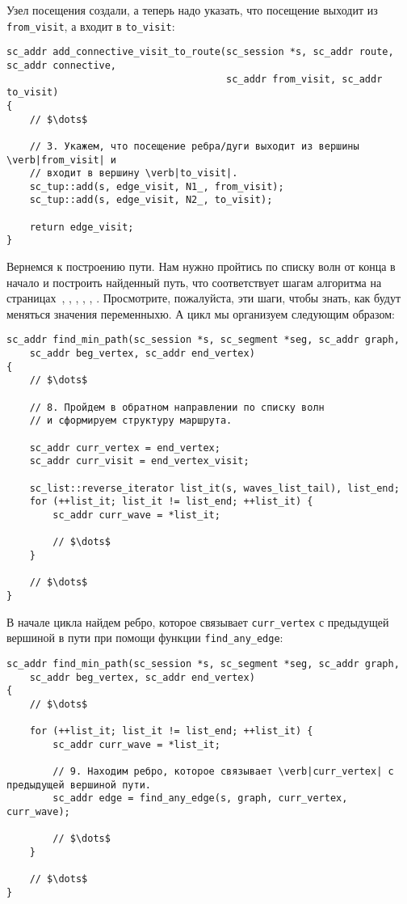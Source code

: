 Узел посещения создали, а теперь надо указать, что посещение выходит
из \lstinline|from_visit|, а входит в \lstinline|to_visit|:

\begin{lstlisting}[texcl]
sc_addr add_connective_visit_to_route(sc_session *s, sc_addr route, sc_addr connective,
                                      sc_addr from_visit, sc_addr to_visit)
{
    // $\dots$

    // 3. Укажем, что посещение ребра/дуги выходит из вершины \verb|from_visit| и
    // входит в вершину \verb|to_visit|.
    sc_tup::add(s, edge_visit, N1_, from_visit);
    sc_tup::add(s, edge_visit, N2_, to_visit);

    return edge_visit;
}
\end{lstlisting}

Вернемся к построению пути. Нам нужно пройтись по списку волн от конца
в начало и построить найденный путь, что соответствует шагам алгоритма
на страницах~\pageref{astep:S10_Step_building_route_structure},
\pageref{astep:S11_Step_building_route_structure_add_visits},
\pageref{astep:S12_Step_building_route_structure},
\pageref{astep:S13_Step_building_route_structure_add_visits},
\pageref{astep:S14_Step_building_route_structure},
\pageref{astep:S15_Step_building_route_structure_add_visits}. Просмотрите,
пожалуйста, эти шаги, чтобы знать, как будут меняться значения
переменныхю. А цикл мы организуем следующим образом:

\begin{lstlisting}[texcl]
sc_addr find_min_path(sc_session *s, sc_segment *seg, sc_addr graph,
    sc_addr beg_vertex, sc_addr end_vertex)
{
    // $\dots$

    // 8. Пройдем в обратном направлении по списку волн
    // и сформируем структуру маршрута.

    sc_addr curr_vertex = end_vertex;
    sc_addr curr_visit = end_vertex_visit;

    sc_list::reverse_iterator list_it(s, waves_list_tail), list_end;
    for (++list_it; list_it != list_end; ++list_it) {
        sc_addr curr_wave = *list_it;

        // $\dots$
    }

    // $\dots$
}
\end{lstlisting}

В начале цикла найдем ребро, которое связывает \lstinline|curr_vertex|
с предыдущей вершиной в пути при помощи функции
\lstinline|find_any_edge|:

\begin{lstlisting}[texcl]
sc_addr find_min_path(sc_session *s, sc_segment *seg, sc_addr graph,
    sc_addr beg_vertex, sc_addr end_vertex)
{
    // $\dots$

    for (++list_it; list_it != list_end; ++list_it) {
        sc_addr curr_wave = *list_it;

        // 9. Находим ребро, которое связывает \verb|curr_vertex| с предыдущей вершиной пути.
        sc_addr edge = find_any_edge(s, graph, curr_vertex, curr_wave);

        // $\dots$
    }

    // $\dots$
}
\end{lstlisting}

